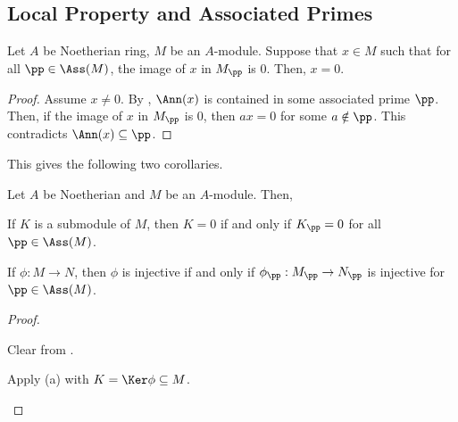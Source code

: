 \subsection{Local Property and Associated Primes}
\begin{corollary}
    \label{cor:local_element_ass}
    Let $A$ be Noetherian ring, $M$ be an $A$-module.
    Suppose that $x\in M$ such that for all $\pp\in\Ass(M)$,
    the image of $x$ in $M_\pp$ is $0$.
    Then, $x=0$.
\end{corollary}
\begin{proof}
    Assume $x\neq 0$.
    By , $\Ann(x)$ is contained in
    some associated prime $\pp$.
    Then, if the image of $x$ in $M_\pp$ is $0$,
    then $ax=0$ for some $a\notin\pp$.
    This contradicts $\Ann(x) \subseteq\pp$.
\end{proof}
This gives the following two corollaries.
\begin{corollary}  
    \label{cor:local_ass}
    Let $A$ be Noetherian and $M$ be an $A$-module.
    Then,
    \begin{alphenum}
    \item If $K$ is a submodule of $M$, 
        then $K=0$ if and only if $K_\pp=0$
	for all $\pp\in \Ass(M)$.
    \item If $\phi : M\to N$, then 
	$\phi$ is injective
	if and only if $\phi_\pp : M_\pp \to N_\pp$
	is injective for $\pp\in\Ass(M)$.
    \end{alphenum}
\end{corollary}
\begin{proof}
    \begin{alphenum}
    \item Clear from .
    \item Apply (a) with $K=\Ker\phi\subseteq M$. \qedhere
    \end{alphenum}
\end{proof}
%
%
%
%
%
%
